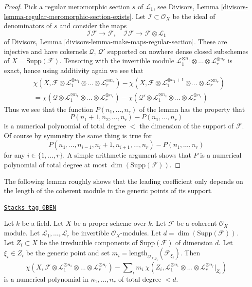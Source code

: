 \begin{proof}
\medskip\noindent
Pick a regular meromorphic section $s$ of $\mathcal{L}_1$, see
Divisors, Lemma \ref{divisors-lemma-regular-meromorphic-section-exists}.
Let $\mathcal{I} \subset \mathcal{O}_X$ be the ideal of
denominators of $s$ and consider the maps
$$
\mathcal{I}\mathcal{F} \to \mathcal{F},\quad
\mathcal{I}\mathcal{F} \to \mathcal{F} \otimes \mathcal{L}_1
$$
of Divisors, Lemma \ref{divisors-lemma-make-maps-regular-section}.
These are injective and have cokernels $\mathcal{Q}$, $\mathcal{Q}'$
supported on nowhere dense closed subschemes of $X = \text{Supp}(\mathcal{F})$.
Tensoring with the invertible module
$\mathcal{L}_1^{\otimes n_1} \otimes \ldots \otimes \mathcal{L}_r^{\otimes n_r}$
is exact, hence using additivity again
we see that
\begin{align*}
&\chi(X, \mathcal{F} \otimes \mathcal{L}_1^{\otimes n_1} \otimes \ldots \otimes
\mathcal{L}_r^{\otimes n_r}) -
\chi(X, \mathcal{F} \otimes \mathcal{L}_1^{\otimes n_1 + 1}
\otimes \ldots \otimes \mathcal{L}_r^{\otimes n_r}) \\
& =
\chi(\mathcal{Q} \otimes \mathcal{L}_1^{\otimes n_1} \otimes \ldots \otimes
\mathcal{L}_r^{\otimes n_r}) -
\chi(\mathcal{Q}' \otimes \mathcal{L}_1^{\otimes n_1} \otimes \ldots \otimes
\mathcal{L}_r^{\otimes n_r})
\end{align*}
Thus we see that the function $P(n_1, \ldots, n_r)$ of the lemma has
the property that
$$
P(n_1 + 1, n_2, \ldots, n_r) - P(n_1, \ldots, n_r)
$$
is a numerical polynomial of total degree $<$ the dimension
of the support of $\mathcal{F}$. Of course by symmetry the same
thing is true for
$$
P(n_1, \ldots, n_{i - 1}, n_i + 1, n_{i + 1}, \ldots, n_r)
- P(n_1, \ldots, n_r)
$$
for any $i \in \{1, \ldots, r\}$. A simple arithmetic argument shows
that $P$ is a numerical polynomial of total degree at most
$\dim(\text{Supp}(\mathcal{F}))$.
\end{proof}

The following lemma roughly shows that the leading coefficient only depends
on the length of the coherent module in the generic points of its
support.

\begin{lemma}
\label{varieties-lemma-numerical-polynomial-leading-term}
\href{https://stacks.math.columbia.edu/tag/0BEN}{\texttt{Stacks tag 0BEN}}

Let $k$ be a field. Let $X$ be a proper scheme over $k$. Let
$\mathcal{F}$ be a coherent $\mathcal{O}_X$-module. Let
$\mathcal{L}_1, \ldots, \mathcal{L}_r$ be invertible $\mathcal{O}_X$-modules.
Let $d = \dim(\text{Supp}(\mathcal{F}))$.
Let $Z_i \subset X$ be the irreducible components
of $\text{Supp}(\mathcal{F})$ of dimension $d$. Let $\xi_i \in Z_i$
be the generic point and set
$m_i = \text{length}_{\mathcal{O}_{X, \xi_i}}(\mathcal{F}_{\xi_i})$.
Then
$$
\chi(X, \mathcal{F} \otimes \mathcal{L}_1^{\otimes n_1} \otimes \ldots \otimes
\mathcal{L}_r^{\otimes n_r}) -
\sum\nolimits_i
m_i\ \chi(Z_i, \mathcal{L}_1^{\otimes n_1} \otimes \ldots \otimes
\mathcal{L}_r^{\otimes n_r}|_{Z_i})
$$
is a numerical polynomial in $n_1, \ldots, n_r$ of total degree $< d$.
\end{lemma}

